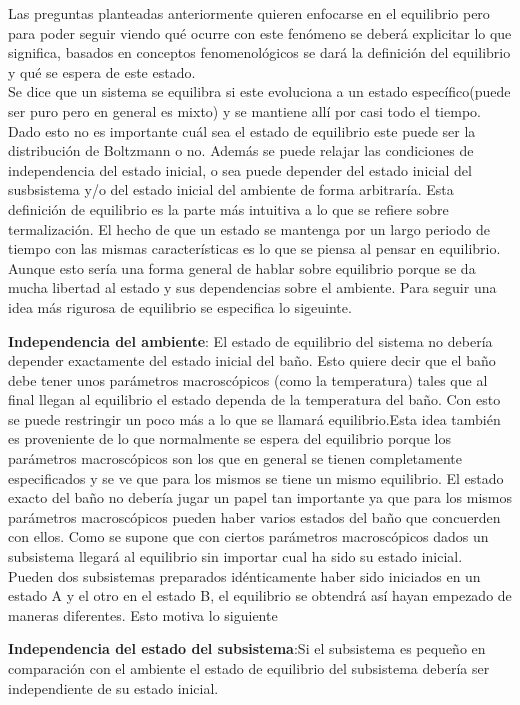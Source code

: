 Las preguntas planteadas anteriormente quieren enfocarse en el equilibrio pero para poder seguir viendo qué ocurre   con este fenómeno se deberá explicitar lo que significa, basados en conceptos fenomenológicos se dará la  definición del equilibrio y qué se espera de este estado.
\\
Se dice que un sistema se equilibra si este evoluciona a un estado específico(puede ser puro pero en general es mixto) y se mantiene allí por casi todo el tiempo. Dado esto no es importante cuál sea el estado de equilibrio este puede ser la distribución de Boltzmann o no. Además se puede relajar las condiciones de independencia del estado inicial, o sea puede depender del estado inicial del susbsistema y/o del estado inicial del ambiente de forma arbitraría. Esta definición de equilibrio es la parte más intuitiva a lo que se refiere sobre termalización. El hecho de que un estado se mantenga por un largo periodo de tiempo con las mismas características es lo que se piensa al  pensar en equilibrio. Aunque esto sería una forma general de hablar sobre equilibrio porque se da mucha libertad al estado y sus dependencias sobre el ambiente. Para seguir una idea más rigurosa de equilibrio se especifica lo sigeuinte.

\textbf{Independencia del ambiente}: El  estado de equilibrio del sistema no debería depender exactamente del estado inicial del baño. Esto quiere decir que el baño debe tener unos parámetros macroscópicos (como la temperatura) tales que al final llegan al equilibrio el estado dependa de la temperatura del baño. Con esto se puede restringir un poco más a lo que se llamará equilibrio.Esta idea también es proveniente de lo que normalmente se espera del equilibrio porque los parámetros macroscópicos son los que en general se tienen completamente especificados y se ve que para los mismos se tiene un mismo equilibrio. El estado exacto del baño no debería jugar un papel  tan importante ya que para los mismos parámetros macroscópicos pueden haber varios estados del baño que concuerden con ellos. Como se supone que con ciertos parámetros macroscópicos dados  un subsistema llegará al equilibrio sin importar cual ha sido su estado inicial. Pueden dos subsistemas preparados idénticamente haber sido iniciados en un estado A y el otro en el estado B, el equilibrio se obtendrá así hayan empezado de maneras diferentes. Esto motiva lo siguiente

\textbf{Independencia del estado del subsistema}:Si el subsistema es pequeño en comparación con el ambiente el estado de equilibrio del subsistema debería ser independiente de su estado inicial.

